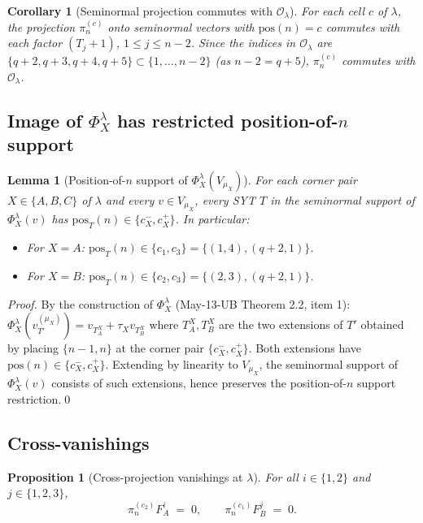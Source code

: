 \documentclass[11pt]{article}
\newtheorem{lemma}[theorem]{Lemma}
\newtheorem{proposition}[theorem]{Proposition}
\newtheorem{corollary}[theorem]{Corollary}
\theoremstyle{definition}
\begin{document}
\begin{corollary}[Seminormal projection commutes with $\mathcal{O}_\lambda$]\label{cor:proj-commute}
For each cell $c$ of $\lambda$, the projection $\pi^{(c)}_n$ onto
seminormal vectors with $\mathrm{pos}(n) = c$ commutes with each
factor $(T_j{+}1)$, $1 \le j \le n - 2$. Since the indices in
$\mathcal{O}_\lambda$ are $\{q+2, q+3, q+4, q+5\} \subset
\{1, \ldots, n-2\}$ (as $n - 2 = q + 5$), $\pi^{(c)}_n$ commutes
with $\mathcal{O}_\lambda$.
\end{corollary}

\subsection{Image of $\Phi_X^\lambda$ has restricted position-of-$n$ support}

\begin{lemma}[Position-of-$n$ support of $\Phi_X^\lambda(V_{\mu_X})$]\label{lem:Phi-pos-supp}
For each corner pair $X \in \{A, B, C\}$ of $\lambda$ and every
$v \in V_{\mu_X}$, every SYT $T$ in the seminormal support of
$\Phi_X^\lambda(v)$ has $\mathrm{pos}_T(n) \in \{c_X^-, c_X^+\}$.
In particular:
\begin{itemize}[leftmargin=2em,topsep=0.2em,itemsep=0.1em]
\item For $X = A$: $\mathrm{pos}_T(n) \in \{c_1, c_3\} = \{(1, 4), (q+2, 1)\}$.
\item For $X = B$: $\mathrm{pos}_T(n) \in \{c_2, c_3\} = \{(2, 3), (q+2, 1)\}$.
\end{itemize}
\end{lemma}

\begin{proof}
By the construction of $\Phi_X^\lambda$ (May-13-UB
Theorem 2.2, item 1): $\Phi_X^\lambda(v_{T'}^{(\mu_X)})
= v_{T_A^X} + \tau_X v_{T_B^X}$ where $T_A^X, T_B^X$ are the two
extensions of $T'$ obtained by placing $\{n-1, n\}$ at the corner
pair $\{c_X^-, c_X^+\}$. Both extensions have
$\mathrm{pos}(n) \in \{c_X^-, c_X^+\}$. Extending by linearity to
$V_{\mu_X}$, the seminormal support of $\Phi_X^\lambda(v)$ consists
of such extensions, hence preserves the position-of-$n$ support
restriction.\qed
\end{proof}

\subsection{Cross-vanishings}

\begin{proposition}[Cross-projection vanishings at $\lambda$]\label{prop:cross-zero}
For all $i \in \{1, 2\}$ and $j \in \{1, 2, 3\}$,
\[
   \pi^{(c_2)}_n F_A^i \;=\; 0,
   \qquad
   \pi^{(c_1)}_n F_B^j \;=\; 0.
\]
\end{proposition}
\end{document}
